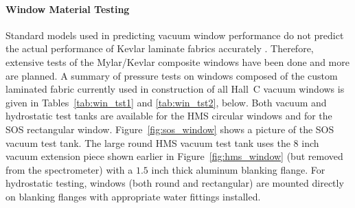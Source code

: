 \paragraph{Window Material Testing}

Standard models used in predicting vacuum
window performance do not predict the actual performance of Kevlar laminate
fabrics accurately \cite{Mapes1993,Leonhardt,rllnl2}. Therefore, extensive tests of the
Mylar/Kevlar composite windows have been done and more are planned.
A summary of pressure
tests on windows composed of the custom laminated
fabric currently used in construction of all Hall~C vacuum windows is
given in Tables~\ref{tab:win_tst1} and \ref{tab:win_tst2}, below. Both vacuum and hydrostatic test 
tanks
are available for the HMS circular windows and for the SOS rectangular
window. Figure~\ref{fig:sos_window} shows a picture of the SOS vacuum
test tank.  The large round
HMS vacuum test tank uses the $8$ inch vacuum extension piece shown
earlier in Figure~\ref{fig:hms_window} (but removed from the spectrometer) with a $1.5$
inch thick aluminum blanking flange. For hydrostatic testing, windows (both
round and rectangular) are mounted directly on
blanking flanges with appropriate water fittings installed.


